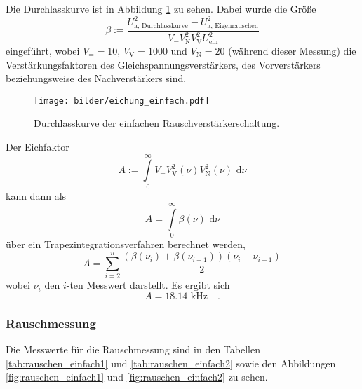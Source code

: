 		Die Durchlasskurve ist in Abbildung \ref{fig:eichung_einfach} zu sehen. Dabei wurde die Größe 
		\begin{equation}
		\beta := \frac{U^2_\text{a, Durchlasskurve}-U_\text{a, Eigenrauschen}^2}
		{V_= V_\text{N}^2 V_\text{V}^2  U^2_\text{ein}}
		\end{equation}
		eingeführt, wobei $V_= =10$, $V_\text{V}=1000$ und $V_\text{N}=20$ (während dieser Messung)
		die Verstärkungsfaktoren des Gleichspannungsverstärkers, des Vorverstärkers beziehungsweise 
		des Nachverstärkers sind.
		
		\begin{figure}
			\centering
			\texttt{[image: bilder/eichung\_einfach.pdf]}
			\caption{Durchlasskurve der einfachen Rauschverstärkerschaltung.}
			\label{fig:eichung_einfach}
		\end{figure}
		
		Der Eichfaktor 
		\begin{equation}
			A:=\int\limits_0^\infty V_= V_\text{V}^2(\nu) V_\text{N}^2(\nu) \text{ d}\nu		
		\end{equation}				
		kann dann als
		\begin{equation}
			A = \int \limits_0^\infty \beta(\nu) \text{ d}\nu
		\end{equation}
		über ein Trapezintegrationsverfahren berechnet werden,
		\begin{equation}
			A = \sum\limits_{i=2}^n \frac{\left(\beta(\nu_i)+
					\beta(\nu_{i-1})\right)(\nu_i-\nu_{i-1})}{2}
		\end{equation}
		wobei $\nu_i$ den $i$-ten Messwert darstellt. Es ergibt sich
		\begin{equation}
			A = 18.14\text{ kHz}  \quad . %
		\end{equation}


	
	\subsubsection{Rauschmessung}
		Die Messwerte für die Rauschmessung sind in den Tabellen \ref{tab:rauschen_einfach1} 
		und \ref{tab:rauschen_einfach2} sowie den Abbildungen 
		\ref{fig:rauschen_einfach1} und \ref{fig:rauschen_einfach2} zu sehen.
		
